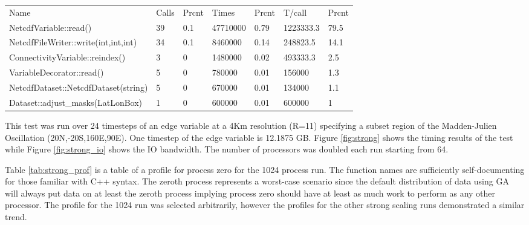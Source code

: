 \begin{table*}[!t]
\center
\caption{Strong Scaling Profile for Process 0}
\label{tab:strong_prof}
\begin{tabular}{lllllll}
Name&Calls&Prcnt&Times&Prcnt&T/call&Prcnt\\
NetcdfVariable::read()&39&0.1&47710000&0.79&1223333.3&79.5\\
NetcdfFileWriter::write(int,int,int)&34&0.1&8460000&0.14&248823.5&14.1\\
ConnectivityVariable::reindex()&3&0&1480000&0.02&493333.3&2.5\\
VariableDecorator::read()&5&0&780000&0.01&156000&1.3\\
NetcdfDataset::NetcdfDataset(string)&5&0&670000&0.01&134000&1.1\\
Dataset::adjust\_masks(LatLonBox)&1&0&600000&0.01&600000&1\\
\end{tabular}
\end{table*}

This test was run over 24 timesteps of an edge variable at a 4Km resolution
(R=11) specifying a subset region of the Madden-Julien Oscillation\cite{MJO}
(20N,-20S,160E,90E).  One timestep of the edge variable is 12.1875 GB.  Figure
\ref{fig:strong} shows the timing results of the test while Figure
\ref{fig:strong_io} shows the IO bandwidth.  The number of processors was
doubled each run starting from 64.

Table \ref{tab:strong_prof} is a table of a profile for process zero for the
1024 process run.  The function names are sufficiently self-documenting for
those familiar with C++ syntax.  The zeroth process represents a worst-case
scenario since the default distribution of data using GA will always put data
on at least the zeroth process implying process zero should have at least as
much work to perform as any other processor.  The profile for the 1024 run was
selected arbitrarily, however the profiles for the other strong scaling runs
demonstrated a similar trend.

